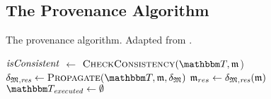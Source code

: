 \subsection{The Provenance Algorithm}

\begin{algorithm}
	\caption{The provenance algorithm. Adapted from \cite{gleitze2020orchestration}.}
	\label{algo:orchestration:provenance}
	

    \begin{algorithmic}[1]
        \State $\mathit{isConsistent}$ $\leftarrow$ $\function{CheckConsistency}(\transformationset{T}, \modeltuple{m}$)
            \State \Return{$\bot$} \label{algo:orchestration:provenance:line:bot_input}
        \EndIf
        \State $\changetuple{\metamodeltuple{M},\mathvariable{res}} \gets %
        \function{Propagate}(\transformationset{T}, \modeltuple{m}, \changetuple{\metamodeltuple{M}})$
            \State \Return{$\bot$} \label{algo:orchestration:provenance:line:bot_orchestration}
        \EndIf
        \State $\mathfrak{m}_{res} \leftarrow \mathfrak{\delta}_{\mathfrak{M},\mathit{res}}(\mathfrak{m})$
        \State {} \label{algo:orchestration:provenance:line:return_result}
    \EndProcedure
    \vspace{\baselineskip}
        \vspace{0.15\baselineskip}
        \State $\provalgexecuted \gets \emptyset$ \label{algo:orchestration:provenance:line:executed_init}
        \vspace{0.3\baselineskip}
        

\end{algorithmic}
\end{algorithm}
